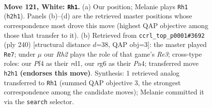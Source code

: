 \documentclass[11pt]{article}
\begin{document}
\clearpage

\begin{figure}[p]\centering
\begin{subfigure}{0.46\textwidth}\centering
\resizebox{\linewidth}{!}{%
\newchessgame
\chessboard[
  setfen={7k/8/p5r1/P1p2p1p/1p3P1P/1P2P1P1/6KR/8 w - - 29 121},
  showmover=false,
  pgfstyle=straightmove, color=movearrow, markmove={h2-h1}
]}
\caption{}
\end{subfigure}\hfill
\begin{subfigure}{0.46\textwidth}\centering
\resizebox{\linewidth}{!}{%
\newchessgame
\chessboard[
  setfen={5k2/8/n1Bp1P1p/p1p3p1/P1P3P1/1P2R2K/8/3r4 w - - 1 121},
  showmover=false,
  pgfstyle=straightmove, color=movearrow, markmove={e3-e7}
]}
\caption{}
\end{subfigure}
\\[4pt]

\caption{\textbf{Move 121, White: \texttt{Rh1}.} (a) Our position; Melanie plays \texttt{Rh1} (\texttt{h2h1}). Panels (b)--(d) are the retrieved master positions whose correspondence most drove this move (highest QAP objective among those that transfer to it). (b) Retrieved from \texttt{ccrl\_top\_p0001\#3692} (ply 240) [structural distance $d$=38, QAP obj=3]: the master played \texttt{Re7}; under $\mu$ our \emph{Rh2} plays the role of that game's \emph{Re3}; cross-type roles: our \emph{P}f4 as their \emph{r}d1, our \emph{r}g6 as their \emph{P}a4; transferred move \texttt{h2h1} \textbf{(endorses this move)}. Synthesis: 1 retrieved analog transferred to \texttt{Rh1} (summed QAP objective 3, the strongest correspondence among the candidate moves); Melanie committed it via the \texttt{search} selector.}
\label{fig:thought-m240}
\end{figure}

\clearpage
\end{document}
